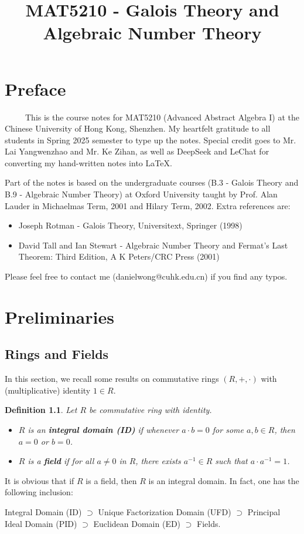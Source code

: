 \documentclass[11pt]{book}
\title{MAT5210 - Galois Theory and Algebraic Number Theory}
\date{}
\newtheorem{definition}[theorem]{Definition}
\begin{document}
\maketitle

\chapter*{Preface}

\ \ \ \ \ This is the course notes for MAT5210 (Advanced Abstract Algebra I) at the Chinese University of Hong Kong, Shenzhen. My heartfelt gratitude to all students in Spring 2025 semester to type up the notes. Special credit goes to Mr. Lai Yangwenzhao and Mr. Ke Zihan, as well as DeepSeek and LeChat for converting my hand-written notes into LaTeX.

\medskip
Part of the notes is based on the undergraduate courses (B.3 - Galois Theory and B.9 - Algebraic Number Theory) at Oxford University taught by Prof. Alan Lauder in Michaelmas Term, 2001 and Hilary Term, 2002. Extra references are:
\begin{itemize}
    \item Joseph Rotman - Galois Theory, Universitext, Springer (1998)
    \item David Tall and Ian Stewart
 - Algebraic Number Theory and Fermat's Last Theorem: Third Edition, A K Peters/CRC Press (2001)
\end{itemize}


\medskip
Please feel free to contact me (danielwong@cuhk.edu.cn) if you find any typos.



\tableofcontents


\chapter{Preliminaries}
\section{Rings and Fields}
In this section, we recall some results on commutative rings $(R, +, \cdot )$ with (multiplicative) identity $1 \in R$.
\begin{definition}
    Let $R$ be commutative ring with identity. 
    \begin{itemize}
        \item $R$ is an {\bf integral domain (ID)} if whenever
    $a \cdot b = 0$ for some $a, b \in R$, then $a = 0$ or $b = 0$.
        \item $R$ is a {\bf field} if for all $a \neq 0$ in $R$, there exists $a^{-1} \in R$ such that $a \cdot a^{-1} = 1$.
    \end{itemize}
\end{definition}
It is obvious that if $R$ is a field, then $R$ is an integral domain. In fact, one has the following inclusion:
\begin{center}
Integral Domain (ID) $\supset$ Unique Factorization Domain (UFD) $\supset$ Principal Ideal Domain (PID) $\supset$ Euclidean Domain (ED) $\supset$ Fields.    
\end{center}
\end{document}
